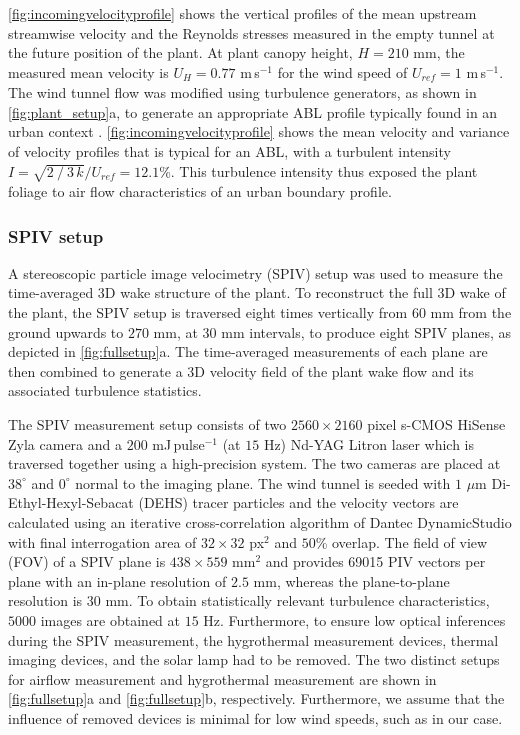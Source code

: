 \cref{fig:incomingvelocityprofile} shows the vertical profiles of the mean upstream streamwise velocity and the Reynolds stresses measured in the empty tunnel at the future position of the plant. At plant canopy height,  $H=210$ mm, the measured mean velocity is $U_H=0.77$ m\,s$^{-1}$  for the wind speed of $U_{\textit{ref}}=1$ m\,s$^{-1}$. The wind tunnel flow was modified using turbulence generators, as shown in \cref{fig:plant_setup}a, to generate an appropriate ABL profile typically found in an urban context \citep{Tsalicoglou2018}. \cref{fig:incomingvelocityprofile} shows the mean velocity and variance of velocity profiles that is typical for an ABL, with a turbulent intensity $I=\sqrt{2⁄3\,k}/U_{\textit{ref}}= 12.1$\%. This turbulence intensity thus exposed the plant foliage to air flow characteristics of an urban boundary profile. 


\subsubsection*{SPIV setup}
A stereoscopic particle image velocimetry (SPIV) setup was used to measure the time-averaged 3D wake structure of the plant. To reconstruct the full 3D wake of the plant, the SPIV setup is traversed eight times vertically from $60$ mm from the ground upwards to $270$ mm, at $30$ mm intervals, to produce eight SPIV planes, as depicted in \cref{fig:fullsetup}a. The time-averaged measurements of each plane are then combined to generate a 3D velocity field of the plant wake flow and its associated turbulence statistics. 

The SPIV measurement setup consists of two $2560 \times 2160$ pixel s-CMOS HiSense Zyla camera and a $200$ mJ\,pulse$^{-1}$ (at $15$ Hz) Nd-YAG Litron laser which is traversed together using a high-precision system. The two cameras are placed at $38^{\circ}$ and $0^{\circ}$ normal to the imaging plane. The wind tunnel is seeded with $1$ $\mu$m Di-Ethyl-Hexyl-Sebacat (DEHS) tracer particles and the velocity vectors are calculated using an iterative cross-correlation algorithm of Dantec DynamicStudio with final interrogation area of $32\times32$ px$^2$ and $50$\%  overlap. The field of view (FOV) of a SPIV plane is $438\times559$ mm$^2$ and provides \num{69015} PIV vectors per plane with an in-plane resolution of $2.5$ mm, whereas the plane-to-plane resolution is $30$ mm. To obtain statistically relevant turbulence characteristics, $\num{5000}$ images are obtained at $15$ Hz. Furthermore, to ensure low optical inferences during the SPIV measurement, the hygrothermal measurement devices, thermal imaging devices, and the solar lamp had to be removed. The two distinct setups for airflow measurement and hygrothermal measurement are shown in \cref{fig:fullsetup}a and \cref{fig:fullsetup}b, respectively. Furthermore, we assume that the influence of removed devices is minimal for low wind speeds, such as in our case.

